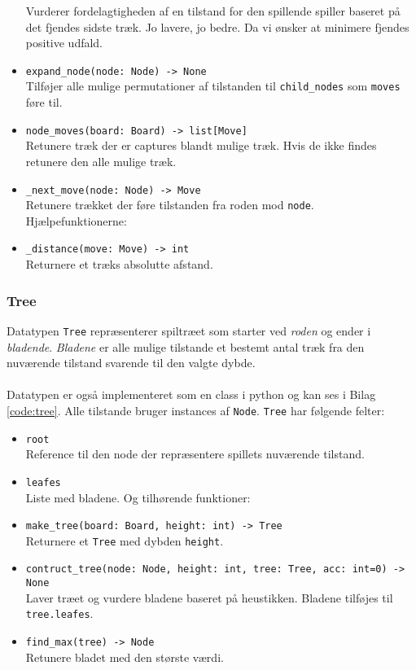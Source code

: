 \begin{itemize}
    Vurderer fordelagtigheden af en tilstand for den spillende spiller baseret på det fjendes sidste træk. Jo lavere, jo bedre.
    Da vi ønsker at minimere fjendes positive udfald.
    \item \texttt{expand\_node(node: Node) -> None}\\
    Tilføjer alle mulige permutationer af tilstanden til \texttt{child\_nodes} som \texttt{moves} føre til.
    \item \texttt{node\_moves(board: Board) -> list[Move]}\\
    Retunere træk der er captures blandt mulige træk. Hvis de ikke findes retunere den alle mulige træk.
    \item \texttt{\_next\_move(node: Node) -> Move}\\
    Retunere trækket der føre tilstanden fra roden mod \texttt{node}.
    \bigbreak
    Hjælpefunktionerne:
    \item \texttt{\_distance(move: Move) -> int}\\
    Returnere et træks absolutte afstand.
\end{itemize}

\subsubsection{Tree}
Datatypen \texttt{Tree} repræsenterer spiltræet som starter ved \textit{roden} og ender i \textit{bladende}.
\textit{Bladene} er alle mulige tilstande et bestemt antal træk fra den nuværende tilstand svarende til
den valgte dybde.
\\
\\
Datatypen er også implementeret som en class i python og kan ses i Bilag \ref{code:tree}.
Alle tilstande bruger instances af \texttt{Node}.
\bigbreak
\texttt{Tree} har følgende felter:
\begin{itemize}
    \item \texttt{root}\\
    Reference til den node der repræsentere spillets nuværende tilstand.
    \item \texttt{leafes}\\
    Liste med bladene.
    \bigbreak
    Og tilhørende funktioner:
    \item \texttt{make\_tree(board: Board, height: int) -> Tree}\\
    Returnere et \texttt{Tree} med dybden \texttt{height}.
    \item \texttt{contruct\_tree(node: Node, height: int, tree: Tree, acc: int=0) -> None}\\
    Laver træet og vurdere bladene baseret på heustikken. Bladene tilføjes til \texttt{tree.leafes}.
    \item \texttt{find\_max(tree) -> Node}\\
    Retunere bladet med den største værdi.
\end{itemize}


